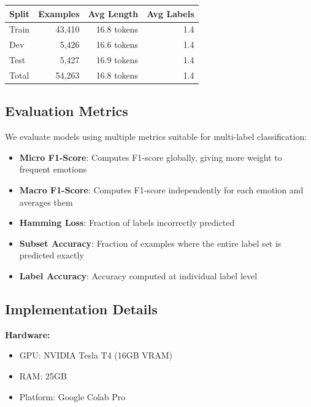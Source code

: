\documentclass[12pt,a4paper]{article}
\begin{document}
\begin{tablebox}
\centering
\caption{GoEmotions Dataset Statistics}
\label{tab:dataset_stats}
\begin{tabular}{lrrr}
\toprule
\textbf{Split} & \textbf{Examples} & \textbf{Avg Length} & \textbf{Avg Labels} \\
\midrule
Train & 43,410 & 16.8 tokens & 1.4 \\
Dev & 5,426 & 16.6 tokens & 1.4 \\
Test & 5,427 & 16.9 tokens & 1.4 \\
\midrule
Total & 54,263 & 16.8 tokens & 1.4 \\
\bottomrule
\end{tabular}
\end{tablebox}

\subsection{Evaluation Metrics}

We evaluate models using multiple metrics suitable for multi-label classification:

\begin{itemize}
    \item \textbf{Micro F1-Score}: Computes F1-score globally, giving more weight to frequent emotions
    \item \textbf{Macro F1-Score}: Computes F1-score independently for each emotion and averages them
    \item \textbf{Hamming Loss}: Fraction of labels incorrectly predicted
    \item \textbf{Subset Accuracy}: Fraction of examples where the entire label set is predicted exactly
    \item \textbf{Label Accuracy}: Accuracy computed at individual label level
\end{itemize}

\subsection{Implementation Details}

\textbf{Hardware:}
\begin{itemize}
    \item GPU: NVIDIA Tesla T4 (16GB VRAM)
    \item RAM: 25GB
    \item Platform: Google Colab Pro
\end{itemize}
\end{document}
